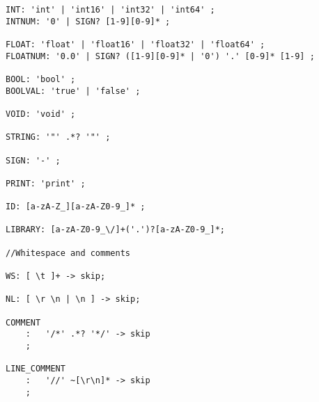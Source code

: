 \begin{lstlisting}[caption={\acrshort{cfg} and Lexing rules},frame=tlrb,label={app:CFG},numbers=none]
INT: 'int' | 'int16' | 'int32' | 'int64' ;
INTNUM: '0' | SIGN? [1-9][0-9]* ;

FLOAT: 'float' | 'float16' | 'float32' | 'float64' ;  
FLOATNUM: '0.0' | SIGN? ([1-9][0-9]* | '0') '.' [0-9]* [1-9] ;

BOOL: 'bool' ;
BOOLVAL: 'true' | 'false' ;

VOID: 'void' ;

STRING: '"' .*? '"' ;

SIGN: '-' ;   

PRINT: 'print' ; 

ID: [a-zA-Z_][a-zA-Z0-9_]* ;    

LIBRARY: [a-zA-Z0-9_\/]+('.')?[a-zA-Z0-9_]*;

//Whitespace and comments

WS: [ \t ]+ -> skip;

NL: [ \r \n | \n ] -> skip;

COMMENT
    :   '/*' .*? '*/' -> skip
    ;

LINE_COMMENT
    :   '//' ~[\r\n]* -> skip
    ;

\end{lstlisting}